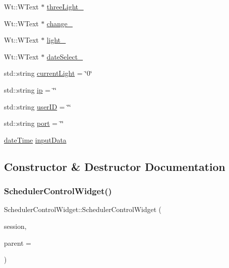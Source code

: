 \begin{DoxyCompactItemize}
\item 
Wt\+::\+W\+Text $\ast$ \hyperlink{class_scheduler_control_widget_a9cba1fa625c734f4dbbf11d8a0218004}{three\+Light\+\_\+}
\item 
Wt\+::\+W\+Text $\ast$ \hyperlink{class_scheduler_control_widget_a9e38298e1acc9bcee2052d62b9aad527}{change\+\_\+}
\item 
Wt\+::\+W\+Text $\ast$ \hyperlink{class_scheduler_control_widget_af92e4f56cb39cd45150c947babd5c0a7}{light\+\_\+}
\item 
Wt\+::\+W\+Text $\ast$ \hyperlink{class_scheduler_control_widget_a156653c34485d3435d079593968e3dba}{date\+Select\+\_\+}
\item 
std\+::string \hyperlink{class_scheduler_control_widget_a1623869aaefe631dba02f2533033d2a2}{current\+Light} = \char`\"{}0\char`\"{}
\item 
std\+::string \hyperlink{class_scheduler_control_widget_a320557ef7428e36682b21d9ad3b877ba}{ip} = \char`\"{}\char`\"{}
\item 
std\+::string \hyperlink{class_scheduler_control_widget_af73ee1b98fb7944ae193d5e880a59f31}{user\+ID} = \char`\"{}\char`\"{}
\item 
std\+::string \hyperlink{class_scheduler_control_widget_add76e052c3bbb0bedfef92ff5121e8b0}{port} = \char`\"{}\char`\"{}
\item 
\hyperlink{structdate_time}{date\+Time} \hyperlink{class_scheduler_control_widget_a79515f4694dac8b92af2582498654ec4}{input\+Data}
\end{DoxyCompactItemize}


\subsection{Constructor \& Destructor Documentation}
\mbox{\label{class_scheduler_control_widget_a88824ef71ef84e9e5bdb85ab3f4f9952}} 
\subsubsection{\texorpdfstring{Scheduler\+Control\+Widget()}{SchedulerControlWidget()}}
{\footnotesize\ttfamily Scheduler\+Control\+Widget\+::\+Scheduler\+Control\+Widget (\begin{DoxyParamCaption}\item[{\hyperlink{class_session}{Session} $\ast$}]{session,  }\item[{Wt\+::\+W\+Container\+Widget $\ast$}]{parent = {} }\end{DoxyParamCaption})}



